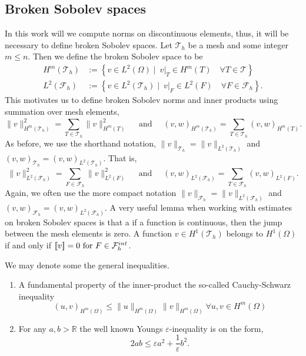 \subsection{Broken Sobolev spaces}%
\label{sub:broken_sobolev_spaces}

In this work will we compute norms on discontinuous elements, thus, it will be necessary to define broken Sobolev spaces.
Let $\mathcal{T}_{h} $ be a mesh and some integer $m\le n$. Then we define the broken Sobolev space to be \[
    \begin{split}
H^{m}( \mathcal{T}_{h} ) & := \left\{ v \in L^2( \Omega )  \mid \ v|_{T} \in H^{m}( T) \quad     \forall T \in  \mathcal{T} \right\}\\
        L^{2}( \mathcal{F}_{h} ) &:= \left\{ v \in L^2( \mathcal{T}_{h}  )  \mid   \ v|_{F} \in L^{2}( F)  \quad  \forall F \in  \mathcal{F}_{h}   \right\}.
    \end{split}
\]
This motivates us to define broken Sobolev norms and inner products using summation over mesh elements,
\[
 \| v \|_{H^{m}( \mathcal{T}_{h} ) }^{2} = \sum_{T \in  \mathcal{T}_{h} }^{} \| v  \|_{ H^{m}( T ) }^{2  } \quad \text{ and } \quad
 (v ,w )_{H^{m}( \mathcal{T}_{h} ) }^{} = \sum_{T \in \mathcal{T} _{h}}^{} (v ,w )_{ H^{m}( T ) }^{  } .
\]
As before, we use the shorthand notation,  $\| v \|_{\mathcal{T}_{h}} =  \| v \|_{L^{2}( \mathcal{T}_{h} ) }$ and  $(v ,w )_{ \mathcal{T}_{h} }^{} = (v ,w )_{L^2( \mathcal{T}_{h} ) }^{} $.
That is,
\[
 \| v \|_{L^{2}( \mathcal{F}_{h} ) }^{2} = \sum_{F \in  \mathcal{F}_{h} }^{} \| v  \|_{ L^{2}( F ) }^{2  } \quad \text{ and } \quad
 (v ,w )_{L^{2}( \mathcal{F}_{h} ) }^{} = \sum_{T \in \mathcal{F} _{h}}^{} (v ,w )_{ L^{2}( F ) }^{  } .
\]
Again, we often use the more compact notation $\| v \|_{\mathcal{F}_{h}} =  \| v \|_{L^{2}( \mathcal{F}_{h} ) }$ and  $(v ,w )_{ \mathcal{F}_{h} }^{} = (v ,w )_{L^2( \mathcal{F}_{h} ) }^{} $.
A very useful lemma when working with estimates on broken Sobolev spaces is that a if a function is continuous, then the jump between the mesh elements is zero. A function $ v \in  H^{1}( \mathcal{T}_{h} ) $ belongs to $ H^{1}( \Omega )  $ if and only
if $ \left[\!\left[  v  \right]\!\right]   = 0 \text{ for }  F \in \mathcal{F}^{int}_{h}$.

We may denote some the general inequalities.
\begin{enumerate}[label=(\roman*)]
    \item A fundamental property of the inner-product the so-called Cauchy-Schwarz inequality
    \[
     ( u,v)_{H^{m}( \Omega )  }   \le \| u \|_{H^{m}( \Omega )   }^{  } \| v \|_{H^{m}( \Omega )    }^{  } \forall u,v \in H^{m}( \Omega )
    \]

    \item For any $a,b >\mathbb{R} $ the well known Youngs $\varepsilon $-inequality is on the form,
        \[
            2ab \le \varepsilon a^2+ \frac{1}{\varepsilon } b^2.
        \]
\end{enumerate}



